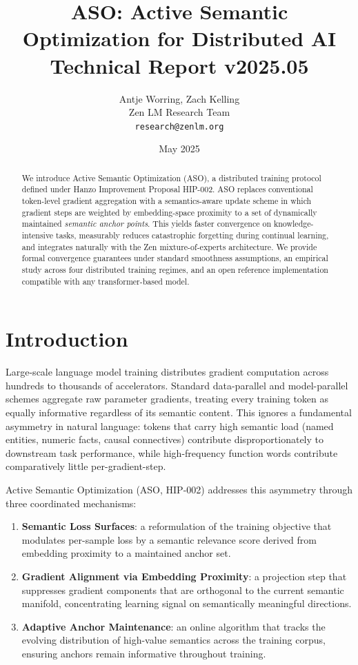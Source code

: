 \documentclass[11pt,a4paper]{article}
\title{\textbf{ASO: Active Semantic Optimization for Distributed AI}\\
\large Technical Report v2025.05}
\author{Antje Worring, Zach Kelling \\ Zen LM Research Team\\
\texttt{research@zenlm.org}}
\date{May 2025}
\begin{document}
\maketitle

\begin{abstract}
We introduce Active Semantic Optimization (ASO), a distributed training protocol defined
under Hanzo Improvement Proposal HIP-002. ASO replaces conventional token-level gradient
aggregation with a semantics-aware update scheme in which gradient steps are weighted by
embedding-space proximity to a set of dynamically maintained \emph{semantic anchor points}.
This yields faster convergence on knowledge-intensive tasks, measurably reduces catastrophic
forgetting during continual learning, and integrates naturally with the Zen
mixture-of-experts architecture. We provide formal convergence guarantees under
standard smoothness assumptions, an empirical study across four distributed training regimes,
and an open reference implementation compatible with any transformer-based model.
\end{abstract}

\tableofcontents
\newpage

\section{Introduction}
\label{sec:intro}

Large-scale language model training distributes gradient computation across hundreds to
thousands of accelerators. Standard data-parallel and model-parallel schemes aggregate
raw parameter gradients, treating every training token as equally informative regardless
of its semantic content. This ignores a fundamental asymmetry in natural language: tokens
that carry high semantic load (named entities, numeric facts, causal connectives) contribute
disproportionately to downstream task performance, while high-frequency function words
contribute comparatively little per-gradient-step.

Active Semantic Optimization (ASO, HIP-002) addresses this asymmetry through three
coordinated mechanisms:

\begin{enumerate}
    \item \textbf{Semantic Loss Surfaces}: a reformulation of the training objective that
          modulates per-sample loss by a semantic relevance score derived from embedding
          proximity to a maintained anchor set.
    \item \textbf{Gradient Alignment via Embedding Proximity}: a projection step that
          suppresses gradient components that are orthogonal to the current semantic
          manifold, concentrating learning signal on semantically meaningful directions.
    \item \textbf{Adaptive Anchor Maintenance}: an online algorithm that tracks the
          evolving distribution of high-value semantics across the training corpus,
          ensuring anchors remain informative throughout training.
\end{enumerate}
\end{document}
